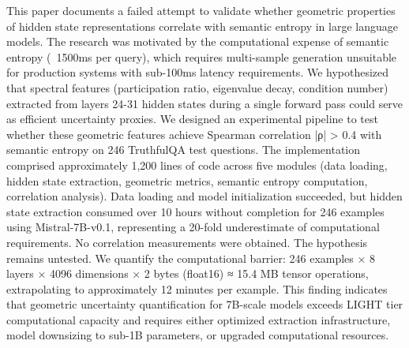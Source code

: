 
This paper documents a failed attempt to validate whether geometric properties of hidden state representations correlate with semantic entropy in large language models. The research was motivated by the computational expense of semantic entropy (~1500ms per query), which requires multi-sample generation unsuitable for production systems with sub-100ms latency requirements. We hypothesized that spectral features (participation ratio, eigenvalue decay, condition number) extracted from layers 24-31 hidden states during a single forward pass could serve as efficient uncertainty proxies. We designed an experimental pipeline to test whether these geometric features achieve Spearman correlation |ρ| > 0.4 with semantic entropy on 246 TruthfulQA test questions. The implementation comprised approximately 1,200 lines of code across five modules (data loading, hidden state extraction, geometric metrics, semantic entropy computation, correlation analysis). Data loading and model initialization succeeded, but hidden state extraction consumed over 10 hours without completion for 246 examples using Mistral-7B-v0.1, representing a 20-fold underestimate of computational requirements. No correlation measurements were obtained. The hypothesis remains untested. We quantify the computational barrier: 246 examples × 8 layers × 4096 dimensions × 2 bytes (float16) ≈ 15.4 MB tensor operations, extrapolating to approximately 12 minutes per example. This finding indicates that geometric uncertainty quantification for 7B-scale models exceeds LIGHT tier computational capacity and requires either optimized extraction infrastructure, model downsizing to sub-1B parameters, or upgraded computational resources.
